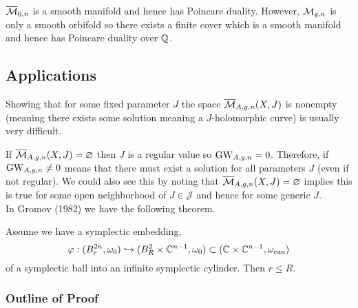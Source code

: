 \documentclass[12pt]{article}
\begin{document}
\begin{rmk}
$\overline{\mathcal{M}}_{0,n}$ is a smooth manifold and hence has Poincare duality. However, $\mathcal{M}_{g,n}$ is only a smooth orbifold so there exists a finite cover which is a smooth manifold and hence has Poincare duality over $\mathbb{Q}$. 
\end{rmk}

\subsection{Applications}

\begin{rmk}
Showing that for some fixed parameter $J$ the space $\overline{\mathcal{M}}_{A,g,n}(X,J)$ is nonempty (meaning there exists some solution meaning a $J$-holomorphic curve) is usually very difficult. 
\end{rmk}

If $\overline{\mathcal{M}}_{A,g,n}(X,J) = \varnothing$ then $J$ is a regular value so $\mathrm{GW}_{A,g,n} = 0$. Therefore, if $\mathrm{GW}_{A,g,n} \neq 0$ means that there must exist a solution for all parameters $J$ (even if not regular). We could also see this by noting that $\overline{\mathcal{M}}_{A,g,n}(X,J) = \varnothing$ implies this is true for some open neighborhood of $J \in \mathcal{J}$ and hence for some generic $J$. 
\bigskip\\
In Gromov (1982) we have the following theorem.

\begin{theorem}[Nonsqueezing]
Assume we have a symplectic embedding, 
\[ \varphi : (B^{2n}_r, \omega_0) \hookrightarrow (B^2_R \times \mathbb{C}^{n-1}, \omega_0) \subset (\mathbb{C} \times \mathbb{C}^{n-1}, \omega_{\text{can}}) \]
of a symplectic ball into an infinite symplectic cylinder. Then $r \le R$. 
\end{theorem}

\subsubsection{Outline of Proof}
\end{document}
